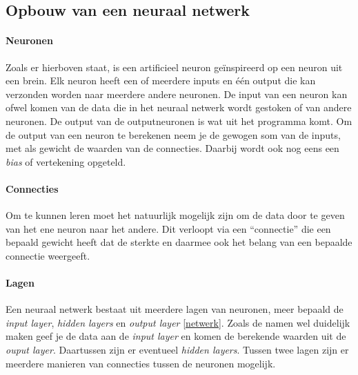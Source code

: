 \documentclass[a4paper,twoside,kulak]{kulakreport}
\begin{document}
\subsection{Opbouw van een neuraal netwerk}
\paragraph{Neuronen}
Zoals er hierboven staat, is een artificieel neuron geïnspireerd op een neuron uit een brein. Elk neuron heeft een of meerdere inputs en één output die kan verzonden worden naar meerdere andere neuronen. De input van een neuron kan ofwel komen van de data die in het neuraal netwerk wordt gestoken of van andere neuronen. De output van de outputneuronen is wat uit het programma komt. Om de output van een neuron te berekenen neem je de gewogen som van de inputs, met als gewicht de waarden van de connecties. Daarbij wordt ook nog eens een \emph{bias} of vertekening opgeteld.

\paragraph{Connecties}
Om te kunnen leren moet het natuurlijk mogelijk zijn om de data door te geven van het ene neuron naar het andere. Dit verloopt via een “connectie” die een bepaald gewicht heeft dat de sterkte en daarmee ook het belang van een bepaalde connectie weergeeft.

\paragraph{Lagen}
Een neuraal netwerk bestaat uit meerdere lagen van neuronen, meer bepaald de \emph{input layer}, \emph{hidden layers} en \emph{output layer} \ref{netwerk}. Zoals de namen wel duidelijk maken geef je de data aan de \emph{input layer} en komen de berekende waarden uit de \emph{ouput layer}. Daartussen zijn er eventueel \emph{hidden layers}. Tussen twee lagen zijn er meerdere manieren van connecties tussen de neuronen mogelijk.
\end{document}
